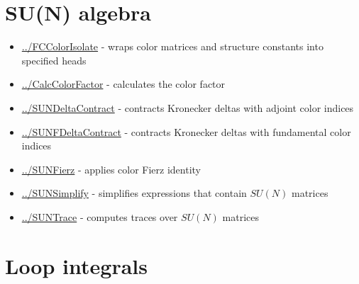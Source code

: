 \documentclass[../FeynCalcManual.tex]{subfiles}
\begin{document}
\hypertarget{su(n) algebra}{
\section{SU(N) algebra}\label{su(n) algebra}}

\begin{itemize}
\tightlist
\item
  \hyperlink{../fccolorisolate}{../FCColorIsolate} - wraps color
  matrices and structure constants into specified heads
\item
  \hyperlink{../calccolorfactor}{../CalcColorFactor} - calculates the
  color factor
\item
  \hyperlink{../sundeltacontract}{../SUNDeltaContract} - contracts
  Kronecker deltas with adjoint color indices
\item
  \hyperlink{../sunfdeltacontract}{../SUNFDeltaContract} - contracts
  Kronecker deltas with fundamental color indices
\item
  \hyperlink{../sunfierz}{../SUNFierz} - applies color Fierz identity
\item
  \hyperlink{../sunsimplify}{../SUNSimplify} - simplifies expressions
  that contain \(SU(N)\) matrices
\item
  \hyperlink{../suntrace}{../SUNTrace} - computes traces over \(SU(N)\)
  matrices
\end{itemize}

\hypertarget{loop integrals}{
\section{Loop integrals}\label{loop integrals}}
\end{document}
